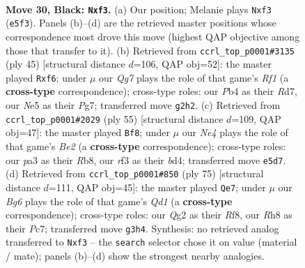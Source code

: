 \documentclass[11pt]{article}
\begin{document}
\clearpage

\begin{figure}[p]\centering
\begin{subfigure}{0.46\textwidth}\centering
\resizebox{\linewidth}{!}{%
\newchessgame
\chessboard[
  setfen={r6r/4k2p/1pp1p1p1/4n3/1p1PK2P/P3PRb1/RP4q1/2BQ4 b - - 3 30},
  showmover=false,
  pgfstyle=straightmove, color=movearrow, markmove={e5-f3}
]}
\caption{}
\end{subfigure}\hfill
\begin{subfigure}{0.46\textwidth}\centering
\resizebox{\linewidth}{!}{%
\newchessgame
\chessboard[
  setfen={5rk1/1p1rb1p1/p1p1pPqp/8/PP1P4/2P2R2/4Q1PP/R5BK b - - 0 23},
  showmover=false,
  pgfstyle=straightmove, color=movearrow, markmove={f8-f6}
]}
\caption{}
\end{subfigure}
\\[4pt]
\begin{subfigure}{0.46\textwidth}\centering
\resizebox{\linewidth}{!}{%
\newchessgame
\chessboard[
  setfen={rr4k1/4bppp/5P2/4P3/2qBQ3/p1P5/6PP/R4R1K b - - 0 28},
  showmover=false,
  pgfstyle=straightmove, color=movearrow, markmove={e7-f8}
]}
\caption{}
\end{subfigure}\hfill
\begin{subfigure}{0.46\textwidth}\centering
\resizebox{\linewidth}{!}{%
\newchessgame
\chessboard[
  setfen={3q1r2/2p2Bk1/1p4pp/r3n3/p1PR3P/2Q3P1/PP3R2/6K1 b - - 0 38},
  showmover=false,
  pgfstyle=straightmove, color=movearrow, markmove={d8-e7}
]}
\caption{}
\end{subfigure}
\caption{\textbf{Move 30, Black: \texttt{Nxf3}.} (a) Our position; Melanie plays \texttt{Nxf3} (\texttt{e5f3}). Panels (b)--(d) are the retrieved master positions whose correspondence most drove this move (highest QAP objective among those that transfer to it). (b) Retrieved from \texttt{ccrl\_top\_p0001\#3135} (ply 45) [structural distance $d$=106, QAP obj=52]: the master played \texttt{Rxf6}; under $\mu$ our \emph{Qg7} plays the role of that game's \emph{Rf1} (a \textbf{cross-type} correspondence); cross-type roles: our \emph{P}b4 as their \emph{R}d7, our \emph{N}e5 as their \emph{P}g7; transferred move \texttt{g2h2}. (c) Retrieved from \texttt{ccrl\_top\_p0001\#2029} (ply 55) [structural distance $d$=109, QAP obj=47]: the master played \texttt{Bf8}; under $\mu$ our \emph{Ne4} plays the role of that game's \emph{Be2} (a \textbf{cross-type} correspondence); cross-type roles: our \emph{p}a3 as their \emph{R}b8, our \emph{r}f3 as their \emph{b}d4; transferred move \texttt{e5d7}. (d) Retrieved from \texttt{ccrl\_top\_p0001\#850} (ply 75) [structural distance $d$=111, QAP obj=45]: the master played \texttt{Qe7}; under $\mu$ our \emph{Bg6} plays the role of that game's \emph{Qd1} (a \textbf{cross-type} correspondence); cross-type roles: our \emph{Q}g2 as their \emph{R}f8, our \emph{R}h8 as their \emph{P}c7; transferred move \texttt{g3h4}. Synthesis: no retrieved analog transferred to \texttt{Nxf3} -- the \texttt{search} selector chose it on value (material / mate); panels (b)--(d) show the strongest nearby analogies.}
\label{fig:thought-m59}
\end{figure}
\end{document}
